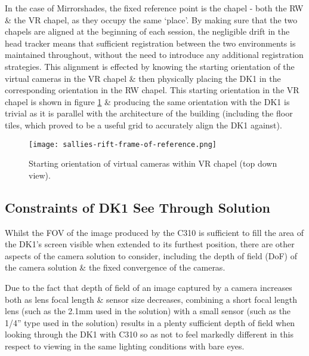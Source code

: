 In the case of Mirrorshades, the fixed reference point is the chapel - both the RW \& the VR chapel, as they occupy the same `place'. By making sure that the two chapels are aligned at the beginning of each session, the negligible drift in the head tracker means that sufficient registration between the two environments is maintained throughout, without the need to introduce any additional registration strategies. This alignment is effected by knowing the starting orientation of the virtual cameras in the VR chapel \& then physically placing the DK1 in the corresponding orientation in the RW chapel. This starting orientation in the VR chapel is shown in figure \ref{sallies-rift-frame-of-reference.png} \& producing the same orientation with the DK1 is trivial as it is parallel with the architecture of the building (including the floor tiles, which proved to be a useful grid to accurately align the DK1 against).

\begin{figure}
	\begin{center}
		\texttt{[image: sallies-rift-frame-of-reference.png]}
		\caption{Starting orientation of virtual cameras within VR chapel (top down view).}
		\label{sallies-rift-frame-of-reference.png}
	\end{center}
\end{figure}


\subsection{Constraints of DK1 See Through Solution}

\label{constraints_of_dk1_see_through_solution}

Whilst the FOV of the image produced by the C310 is sufficient to fill the area of the DK1's screen visible when extended to its furthest position, there are other aspects of the camera solution to consider, including the depth of field (DoF) of the camera solution \& the fixed convergence of the cameras.

Due to the fact that depth of field of an image captured by a camera increases both as lens focal length \& sensor size decreases, combining a short focal length lens (such as the 2.1mm used in the solution) with a small sensor (such as the 1/4'' type used in the solution) results in a plenty sufficient depth of field when looking through the DK1 with C310 so as not to feel markedly different in this respect to viewing in the same lighting conditions with bare eyes.

